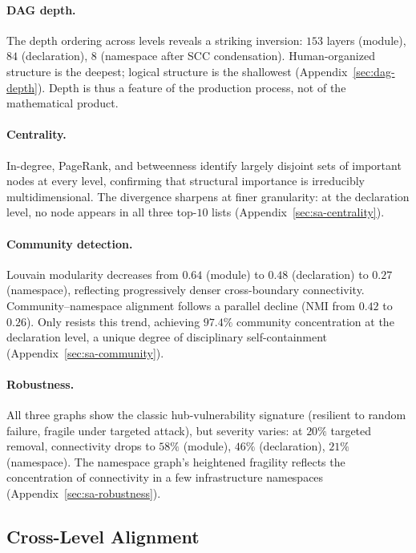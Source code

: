 \paragraph{DAG depth.}
The depth ordering across levels reveals a striking inversion: $153$ layers (module), $84$ (declaration), $8$ (namespace after SCC condensation). Human-organized structure is the deepest; logical structure is the shallowest (Appendix~\ref{sec:dag-depth}). Depth is thus a feature of the production process, not of the mathematical product.

\paragraph{Centrality.}
In-degree, PageRank, and betweenness identify largely disjoint sets of important nodes at every level, confirming that structural importance is irreducibly multidimensional. The divergence sharpens at finer granularity: at the declaration level, no node appears in all three top-$10$ lists (Appendix~\ref{sec:sa-centrality}).

\paragraph{Community detection.}
Louvain modularity decreases from $0.64$ (module) to $0.48$ (declaration) to $0.27$ (namespace), reflecting progressively denser cross-boundary connectivity. Community--namespace alignment follows a parallel decline (NMI from $0.42$ to $0.26$). Only  resists this trend, achieving $97.4\%$ community concentration at the declaration level, a unique degree of disciplinary self-containment (Appendix~\ref{sec:sa-community}).

\paragraph{Robustness.}
All three graphs show the classic hub-vulnerability signature (resilient to random failure, fragile under targeted attack), but severity varies: at $20\%$ targeted removal, connectivity drops to $58\%$ (module), $46\%$ (declaration), $21\%$ (namespace). The namespace graph's heightened fragility reflects the concentration of connectivity in a few infrastructure namespaces (Appendix~\ref{sec:sa-robustness}).

\subsection{Cross-Level Alignment}
\label{sec:cross-level-summary}

